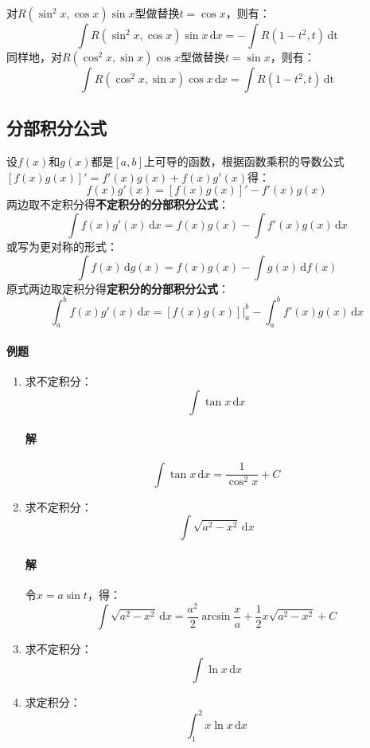 \documentclass[fontset=none,openany,a4paper]{ctexbook}
\begin{document}
对$R(\sin^2 x,\cos x)\sin x$型做替换$t=\cos x$，则有：
\[
\int R(\sin^2 x,\cos x)\sin x\,\mathrm{d}x = -\int R(1-t^2, t)\,\mathrm{dt}
\]
同样地，对$R(\cos^2 x,\sin x)\cos x$型做替换$t=\sin x$，则有：
\[
\int R(\cos^2 x,\sin x)\cos x\,\mathrm{d}x = \int R(1-t^2, t)\,\mathrm{dt}
\]

\subsection{分部积分公式}

设$f(x)$和$g(x)$都是$[a,b]$上可导的函数，根据函数乘积的导数公式$[f(x)g(x)]'=f'(x)g(x)+f(x)g'(x)$得：
\[
f(x)g'(x) = [f(x)g(x)]' - f'(x)g(x)
\]
两边取不定积分得\textbf{不定积分的分部积分公式}：
\[
\int f(x)g'(x)\,\mathrm{d}x = f(x)g(x) - \int f'(x)g(x)\,\mathrm{d}x
\]
或写为更对称的形式：
\[
\int f(x)\,\mathrm{d}g(x) = f(x)g(x) - \int g(x)\,\mathrm{d}f(x)
\]
原式两边取定积分得\textbf{定积分的分部积分公式}：
\[
\int_a^b f(x)g'(x)\,\mathrm{d}x = [f(x)g(x)]|_a^b - \int_a^b f'(x)g(x)\,\mathrm{d}x
\]

\paragraph{例题}

\begin{enumerate}

    \item 求不定积分：
    \[
    \int \tan x\,\mathrm{d}x
    \]

    \paragraph{解}
    \[
    \int \tan x\,\mathrm{d}x = \frac{1}{\cos^2 x} + C
    \]

    \item 求不定积分：
    \[
    \int \sqrt{a^2-x^2}\,\mathrm{d}x
    \]
    \paragraph{解}
    令$x=a\sin t$，得：
    \[
    \int \sqrt{a^2-x^2}\,\mathrm{d}x = \frac{a^2}{2}\arcsin\frac{x}{a} + \frac{1}{2}x\sqrt{a^2-x^2} + C
    \]

    \item 求不定积分：
    \[
    \int \ln x\,\mathrm{d}x
    \]

    \item 求定积分：
    \[
    \int_{1}^{2} x\ln x\,\mathrm{d}x
    \]

\end{enumerate}
\end{document}
